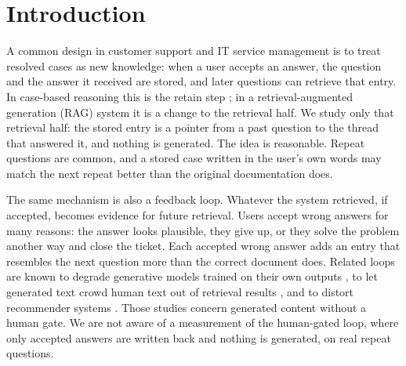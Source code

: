 \documentclass[11pt]{article}
\begin{document}
\section{Introduction}
A common design in customer support and IT service management is to treat resolved cases as new knowledge: when a user accepts an answer, the question and the answer it received are stored, and later questions can retrieve that entry. In case-based reasoning this is the retain step \citep{aamodt1994cbr}; in a retrieval-augmented generation (RAG) system \citep{lewis2020rag} it is a change to the retrieval half. We study only that retrieval half: the stored entry is a pointer from a past question to the thread that answered it, and nothing is generated. The idea is reasonable. Repeat questions are common, and a stored case written in the user's own words may match the next repeat better than the original documentation does.

The same mechanism is also a feedback loop. Whatever the system retrieved, if accepted, becomes evidence for future retrieval. Users accept wrong answers for many reasons: the answer looks plausible, they give up, or they solve the problem another way and close the ticket. Each accepted wrong answer adds an entry that resembles the next question more than the correct document does. Related loops are known to degrade generative models trained on their own outputs \citep{shumailov2024collapse,alemohammad2024mad}, to let generated text crowd human text out of retrieval results \citep{chen2024spiral,yu2026collapse,druck2026ragcollapse}, and to distort recommender systems \citep{chaney2018confounding}. Those studies concern generated content without a human gate. We are not aware of a measurement of the human-gated loop, where only accepted answers are written back and nothing is generated, on real repeat questions.
\end{document}
